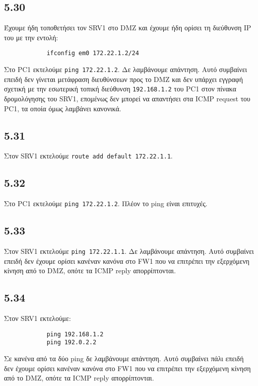 \documentclass[a4paper, 12pt]{article}
\begin{document}
	\subsection*{5.30}
		Έχουμε ήδη τοποθετήσει τον SRV1 στο DMZ και έχουμε ήδη ορίσει τη διεύθυνση IP του με την εντολή:
		
		\begin{verbatim}
			ifconfig em0 172.22.1.2/24
		\end{verbatim}

		Στο PC1 εκτελούμε \verb|ping 172.22.1.2|. Δε λαμβάνουμε απάντηση. Αυτό συμβαίνει επειδή δεν γίνεται μετάφραση διευθύνσεων προς το DMZ και δεν υπάρχει εγγραφή σχετική με την εσωτερική τοπική διεύθυνση \verb|192.168.1.2| του PC1 στον πίνακα δρομολόγησης του SRV1, επομένως δεν μπορεί να απαντήσει στα ICMP request του PC1, τα οποία όμως λαμβάνει κανονικά.
		
	\subsection*{5.31}
		Στον SRV1 εκτελούμε \verb|route add default 172.22.1.1|.

	\subsection*{5.32}
		Στο PC1 εκτελούμε \verb|ping 172.22.1.2|. Πλέον το ping είναι επιτυχές.

	\subsection*{5.33}
		Στον SRV1 εκτελούμε \verb|ping 172.22.1.1|. Δε λαμβάνουμε απάντηση. Αυτό συμβαίνει επειδή δεν έχουμε ορίσει κανέναν κανόνα στο FW1 που να επιτρέπει την εξερχόμενη κίνηση από το DMZ, οπότε τα ICMP reply απορρίπτονται.

	\subsection*{5.34}
		Στον SRV1 εκτελούμε: 
		
		\begin{verbatim}
			ping 192.168.1.2
			ping 192.0.2.2
		\end{verbatim}

		Σε κανένα από τα δύο ping δε λαμβάνουμε απάντηση. Αυτό συμβαίνει πάλι επειδή δεν έχουμε ορίσει κανέναν κανόνα στο FW1 που να επιτρέπει την εξερχόμενη κίνηση από το DMZ, οπότε τα ICMP reply απορρίπτονται.
\end{document}
